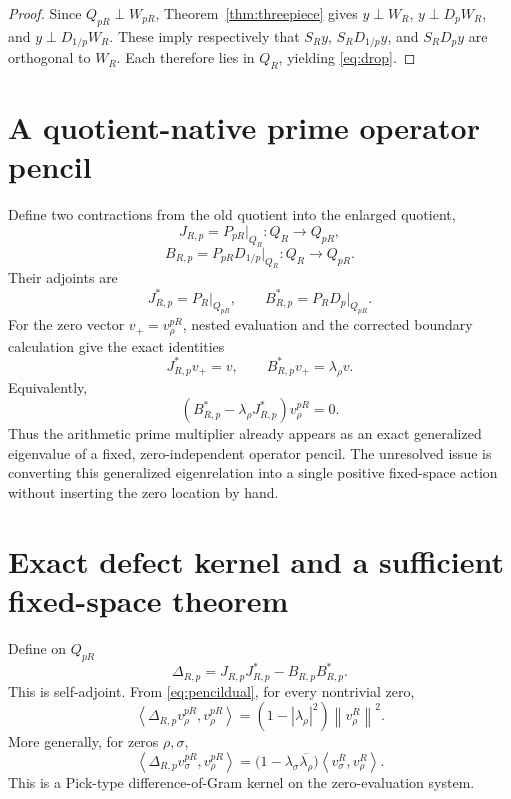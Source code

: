 \documentclass[11pt]{article}
\theoremstyle{remark}
\newcommand{\norm}[1]{\left\lVert #1\right\rVert}
\newcommand{\ip}[2]{\left\langle #1,#2\right\rangle}
\begin{document}
\begin{proof}
Since $Q_{pR}\perp W_{pR}$, Theorem~\ref{thm:threepiece} gives
$y\perp W_R$, $y\perp D_pW_R$, and $y\perp D_{1/p}W_R$. These imply respectively that $S_Ry$, $S_RD_{1/p}y$, and $S_RD_py$ are orthogonal to $W_R$. Each therefore lies in $Q_R$, yielding \eqref{eq:drop}.
\end{proof}

\section{A quotient-native prime operator pencil}
Define two contractions from the old quotient into the enlarged quotient,
\[
 J_{R,p}=P_{pR}\big|_{Q_R}:Q_R\to Q_{pR},
\]
\[
 B_{R,p}=P_{pR}D_{1/p}\big|_{Q_R}:Q_R\to Q_{pR}.
\]
Their adjoints are
\[
 J_{R,p}^*=P_R\big|_{Q_{pR}},\qquad
 B_{R,p}^*=P_RD_p\big|_{Q_{pR}}.
\]
For the zero vector $v_+=v_\rho^{pR}$, nested evaluation and the corrected boundary calculation give the exact identities
\begin{equation}\label{eq:pencildual}
 J_{R,p}^*v_+=v,
 \qquad
 B_{R,p}^*v_+=\lambda_\rho v.
\end{equation}
Equivalently,
\begin{equation}\label{eq:pencil}
 (B_{R,p}^*-\lambda_\rho J_{R,p}^*)v_\rho^{pR}=0.
\end{equation}
Thus the arithmetic prime multiplier already appears as an exact generalized eigenvalue of a fixed, zero-independent operator pencil. The unresolved issue is converting this generalized eigenrelation into a single positive fixed-space action without inserting the zero location by hand.

\section{Exact defect kernel and a sufficient fixed-space theorem}
Define on $Q_{pR}$
\begin{equation}\label{eq:Delta}
 \Delta_{R,p}=J_{R,p}J_{R,p}^*-B_{R,p}B_{R,p}^*.
\end{equation}
This is self-adjoint. From \eqref{eq:pencildual}, for every nontrivial zero,
\begin{equation}\label{eq:Deltadiag}
 \ip{\Delta_{R,p}v_\rho^{pR}}{v_\rho^{pR}}
 =(1-|\lambda_\rho|^2)\norm{v_\rho^R}^2.
\end{equation}
More generally, for zeros $\rho,\sigma$,
\begin{equation}\label{eq:Pick}
 \ip{\Delta_{R,p}v_\sigma^{pR}}{v_\rho^{pR}}
 =\bigl(1-\lambda_\sigma\overline{\lambda_\rho}\bigr)
   \ip{v_\sigma^R}{v_\rho^R}.
\end{equation}
This is a Pick-type difference-of-Gram kernel on the zero-evaluation system.
\end{document}
